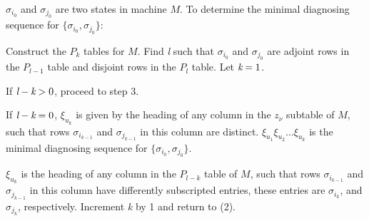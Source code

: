 \algorithm $\sigma_{i_{0}}$ and $\sigma_{j_{0}}$ are two states in machine $M$. To determine the minimal diagnosing sequence for $ \{  \sigma_{i_{0}}, \sigma_{j_{0}} \} $:  \begin{inparaenum}[ (1) ]
    \item Construct the $P_k$ tables for $M$. Find \emph{l} such that $\sigma_{i_{0}}$ and $\sigma_{j_{0}}$ are adjoint rows in the $P_{l-1}$ table and disjoint rows in the $P_l$ table. Let $\emph{k}=1$.
    \item \begin{inparaenum}[ (a) ]
        \item If $ \emph{l} - \emph{k} > 0 $, proceed to step 3.
        \item If $ \emph{l} - \emph{k} = 0 $, $\xi_{u_{k}}$ is given by the heading of any column in the $z_\nu$ subtable of $M$, such that rows $\sigma_{i_{k-1}}$ and $\sigma_{j_{k-1}}$ in this column are distinct. $\xi_{u_{1}}\xi_{u_{2}}...\xi_{u_{k}}$ is the minimal diagnosing sequence for $ \{  \sigma_{i_{0}}, \sigma_{j_{0}} \} $.
    \end{inparaenum}
\item $\xi_{u_{k}}$ is the heading of any column in the $P_{l-k}$ table of $M$, such that rows $\sigma_{i_{k-1}}$ and $\sigma_{j_{k-1}}$ in this column have differently subscripted entries, these entries are $\sigma_{i_{k}}$, and  $\sigma_{j_{k}}$, respectively. Increment \emph{k} by 1 and return to (2).
\end{inparaenum}


